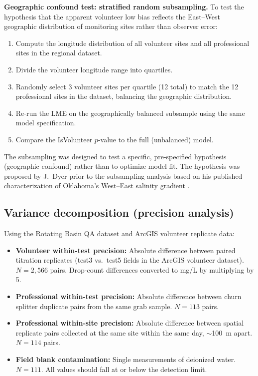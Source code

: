 \documentclass[lineno]{wlpeerj}
\begin{document}
\textbf{Geographic confound test: stratified random subsampling.} To test the hypothesis that the apparent volunteer low bias reflects the East--West geographic distribution of monitoring sites rather than observer error:

\begin{enumerate}
  \item Compute the longitude distribution of all volunteer sites and all professional sites in the regional dataset.
  \item Divide the volunteer longitude range into quartiles.
  \item Randomly select 3 volunteer sites per quartile (12 total) to match the 12 professional sites in the dataset, balancing the geographic distribution.
  \item Re-run the LME on the geographically balanced subsample using the same model specification.
  \item Compare the IsVolunteer $p$-value to the full (unbalanced) model.
\end{enumerate}

The subsampling was designed to test a specific, pre-specified hypothesis (geographic confound) rather than to optimize model fit. The hypothesis was proposed by J.\ Dyer prior to the subsampling analysis based on his published characterization of Oklahoma's West--East salinity gradient \citep{Dyer2025}.

\subsection{Variance decomposition (precision analysis)}
\label{sec:variance}

Using the Rotating Basin QA dataset and ArcGIS volunteer replicate data:

\begin{itemize}
  \item \textbf{Volunteer within-test precision:} Absolute difference between paired titration replicates (test3 vs.\ test5 fields in the ArcGIS volunteer dataset). $N=2{,}566$ pairs. Drop-count differences converted to mg/L by multiplying by 5.
  \item \textbf{Professional within-test precision:} Absolute difference between churn splitter duplicate pairs from the same grab sample. $N=113$ pairs.
  \item \textbf{Professional within-site precision:} Absolute difference between spatial replicate pairs collected at the same site within the same day, $\sim$100~m apart. $N=114$ pairs.
  \item \textbf{Field blank contamination:} Single measurements of deionized water. $N=111$. All values should fall at or below the detection limit.
\end{itemize}
\end{document}
